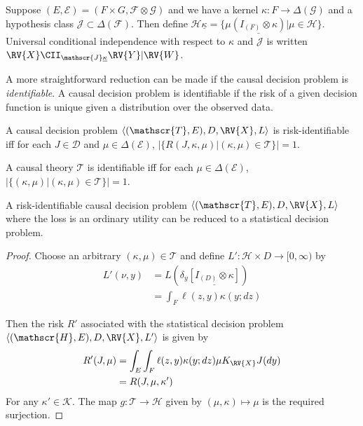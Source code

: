 Suppose $(E,\mathcal{E}) = (F\times G, \mathcal{F}\otimes \mathcal{G})$ and we have a kernel $\kappa:F\to \Delta(\mathcal{G})$ and a hypothesis class $\mathscr{J}\subset\Delta(\mathcal{F})$. Then define $\mathscr{H}\underline{\kappa}=\{\mu\underline{(I_{(F)}\otimes \kappa)}|\mu\in \mathscr{H}\}$. Universal conditional independence with respect to $\kappa$ and $\mathscr{J}$ is written $\RV{X}\CII_{\mathscr{J}\underline{\kappa}} \RV{Y} | \RV{W}$.


A more straightforward reduction can be made if the causal decision problem is \emph{identifiable}. A causal decision problem is identifiable if the risk of a given decision function is unique given a distribution over the observed data.

\begin{definition}[Identifiability]
A causal decision problem $\langle (\mathscr{T}, E), D, \RV{X}, L \rangle$ is risk-identifiable iff for each $J\in \mathscr{D}$ and $\mu\in \Delta(\mathcal{E})$, $|\{R(J,\kappa,\mu)|(\kappa,\mu)\in \mathscr{T}\}|=1$.

A causal theory $\mathscr{T}$ is identifiable iff for each $\mu\in \Delta(\mathcal{E})$, $|\{(\kappa,\mu)|(\kappa,\mu)\in\mathscr{T}\}|=1$.
\end{definition}

\begin{theorem}
A risk-identifiable causal decision problem $\langle (\mathscr{T}, E), D, \RV{X}, L \rangle$ where the loss is an ordinary utility can be reduced to a statistical decision problem.
\end{theorem}

\begin{proof}


Choose an arbitrary $(\kappa,\mu)\in\mathscr{T}$ and define $L':\mathscr{H}\times D\to [0,\infty)$ by
\begin{align}
    L'(\nu,y) &= L(\delta_y\underline{[I_{(D)}\otimes \kappa]})\\
              &= \int_F \ell(z,y) \kappa(y;dz)
\end{align}

Then the risk $R'$ associated with the statistical decision problem $\langle (\mathscr{H},E),D,\RV{X},L'\rangle$ is given by 
\begin{align}
    R'(J,\mu) &= \int_E \int_F \ell(z,y)  \kappa (y;dz) \mu K_{\RV{X}} J(dy)\\
              &= R(J,\mu,\kappa')
\end{align}
For any $\kappa'\in\mathscr{K}$. The map $g:\mathscr{T}\to\mathscr{H}$ given by $(\mu,\kappa)\mapsto \mu$ is the required surjection.
\end{proof}


